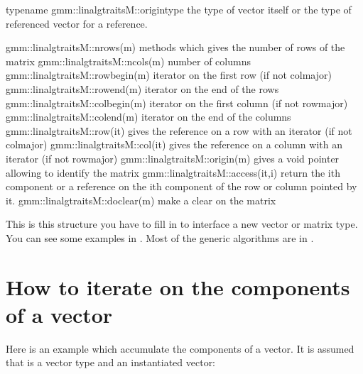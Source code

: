 \documentclass[a4paper,11pt,english]{sphinxmanual}
\begin{document}
\begin{sphinxVerbatim}[commandchars=\\\{\}]
typename gmm::linalg\PYGZus{}traits\PYGZlt{}M\PYGZgt{}::origin\PYGZus{}type    \PYGZhy{}\PYGZhy{}\PYGZgt{} the type of vector itself
                                                   or the type of referenced
                                                   vector for a reference.

gmm::linalg\PYGZus{}traits\PYGZlt{}M\PYGZgt{}::nrows(m)     \PYGZhy{}\PYGZhy{}\PYGZgt{} methods which gives the number of rows of
                                        the matrix
gmm::linalg\PYGZus{}traits\PYGZlt{}M\PYGZgt{}::ncols(m)     \PYGZhy{}\PYGZhy{}\PYGZgt{} number of columns
gmm::linalg\PYGZus{}traits\PYGZlt{}M\PYGZgt{}::row\PYGZus{}begin(m) \PYGZhy{}\PYGZhy{}\PYGZgt{} iterator on the first row (if not col\PYGZus{}major)
gmm::linalg\PYGZus{}traits\PYGZlt{}M\PYGZgt{}::row\PYGZus{}end(m)   \PYGZhy{}\PYGZhy{}\PYGZgt{} iterator on the end of the rows
gmm::linalg\PYGZus{}traits\PYGZlt{}M\PYGZgt{}::col\PYGZus{}begin(m) \PYGZhy{}\PYGZhy{}\PYGZgt{} iterator on the first column
                                        (if not row\PYGZus{}major)
gmm::linalg\PYGZus{}traits\PYGZlt{}M\PYGZgt{}::col\PYGZus{}end(m)   \PYGZhy{}\PYGZhy{}\PYGZgt{} iterator on the end of the columns
gmm::linalg\PYGZus{}traits\PYGZlt{}M\PYGZgt{}::row(it)      \PYGZhy{}\PYGZhy{}\PYGZgt{} gives the reference on a row with an iterator
                                        (if not col\PYGZus{}major)
gmm::linalg\PYGZus{}traits\PYGZlt{}M\PYGZgt{}::col(it)      \PYGZhy{}\PYGZhy{}\PYGZgt{} gives the reference on a column with an
                                        iterator  (if not row\PYGZus{}major)
gmm::linalg\PYGZus{}traits\PYGZlt{}M\PYGZgt{}::origin(m)    \PYGZhy{}\PYGZhy{}\PYGZgt{} gives a void pointer allowing to identify
                                        the matrix
gmm::linalg\PYGZus{}traits\PYGZlt{}M\PYGZgt{}::access(it,i) \PYGZhy{}\PYGZhy{}\PYGZgt{} return the ith component or a reference
                                        on the ith component of the row or
                                        column pointed by it.
gmm::linalg\PYGZus{}traits\PYGZlt{}M\PYGZgt{}::do\PYGZus{}clear(m)  \PYGZhy{}\PYGZhy{}\PYGZgt{} make a clear on the matrix
\end{sphinxVerbatim}

This is this structure you have to fill in to interface a new vector or matrix type. You can see some examples in  . Most of the generic algorithms are in  .


\section{How to iterate on the components of a vector}
\label{\detokenize{gmm/inside:how-to-iterate-on-the-components-of-a-vector}}
Here is an example which accumulate the components of a vector. It is assumed that  is a vector type and  an instantiated vector:
\end{document}
